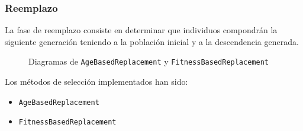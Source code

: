 \documentclass{beamer}
\begin{document}
\begin{frame}
\frametitle{Reemplazo}

La fase de reemplazo consiste en determinar que individuos compondrán la siguiente generación teniendo a la población inicial y a la descendencia generada.

\bigskip

\begin{figure}
    \centering
    \qquad
    \caption{Diagramas de \texttt{AgeBasedReplacement} y \texttt{FitnessBasedReplacement}}
    \label{fig:1}
\end{figure}

Los métodos de selección implementados han sido:

\begin{itemize}
    \item \texttt{AgeBasedReplacement}
    \item \texttt{FitnessBasedReplacement}
\end{itemize}

\end{frame}
\end{document}
